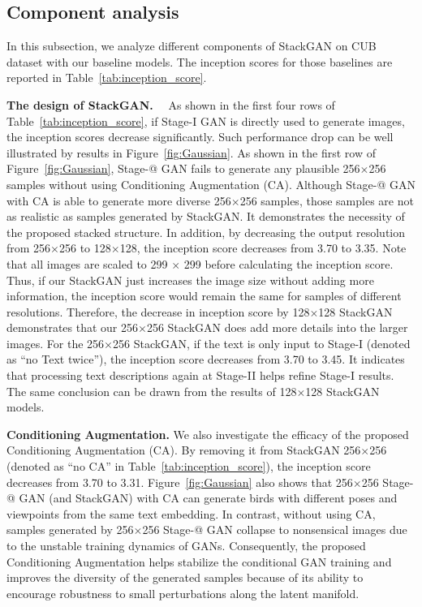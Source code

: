 \subsection{Component analysis}

In this subsection, we analyze different components of StackGAN on CUB dataset with our baseline models. The inception scores for those baselines are reported in Table~\ref{tab:inception_score}.

\textbf{The design of StackGAN.}　
As shown in the first four rows of Table~\ref{tab:inception_score}, if Stage-I GAN is directly used to generate images, the inception scores decrease significantly. Such performance drop can be well illustrated by results in Figure~\ref{fig:Gaussian}. As shown in the first row of Figure~\ref{fig:Gaussian}, Stage-\expandafter\@slowromancap{}@ GAN fails to generate any plausible 256$\times$256 samples without using Conditioning Augmentation (CA). Although Stage-\expandafter\@slowromancap{}@ GAN with CA is able to generate more diverse 256$\times$256 samples, those samples are not as realistic as samples generated by StackGAN. It demonstrates the necessity of the proposed stacked structure. In addition, by decreasing the output resolution from 256$\times$256 to 128$\times$128, the inception score decreases from 3.70 to 3.35. Note that all images are scaled to 299 $\times$ 299 before calculating the inception score. Thus, if our StackGAN just increases the image size without adding more information, the inception score would remain the same for samples of different resolutions. Therefore, the decrease in inception score by 128$\times$128 StackGAN demonstrates that our 256$\times$256 StackGAN does add more details into the larger images. For the 256$\times$256 StackGAN, if the text is only input to Stage-I (denoted as ``no Text twice''), the inception score decreases from 3.70 to 3.45. It indicates that processing text descriptions again at Stage-II helps refine Stage-I results. The same conclusion can be drawn from the results of 128$\times$128 StackGAN models. 

\textbf{Conditioning Augmentation.} We also investigate the efficacy of the proposed Conditioning Augmentation (CA). By removing it from StackGAN 256$\times$256 (denoted as ``no CA'' in Table~\ref{tab:inception_score}), the inception score decreases from 3.70 to 3.31. Figure~\ref{fig:Gaussian} also shows that 256$\times$256 Stage-\expandafter\@slowromancap{}@ GAN (and StackGAN) with CA can generate birds with different poses and viewpoints from the same text embedding. In contrast, without using CA, samples generated by 256$\times$256 Stage-\expandafter\@slowromancap{}@ GAN collapse to nonsensical images due to the unstable training dynamics of GANs. Consequently, the proposed Conditioning Augmentation helps stabilize the conditional GAN training and improves the diversity of the generated samples because of its ability to encourage robustness to small perturbations along the latent manifold. 

